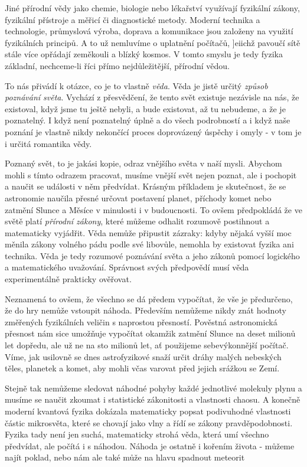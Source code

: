       Jiné přírodní vědy jako chemie, biologie nebo lékařství využívají fyzikální zákony, fyzikální
      přístroje a měřicí či diagnostické metody. Moderní technika a technologie, průmyslová výroba,
      doprava a komunikace jsou založeny na využití fyzikálních principů. A to už nemluvíme o
      uplatnění počítačů, ]eiichž pavoučí sítě stále více opřádají zeměkouli a blízký kosmos. V
      tomto smyslu je tedy fyzika základní, nechceme-li říci přímo nejdůležitější, přírodní vědou. 
      
      To nás přivádí k otázce, co je to vlastně \emph{věda}. Věda je jistě určitý \emph{způsob
      poznávání světa}. Vychází z přesvědčení, že tento svět existuje nezávisle na nás, že
      existoval, když jsme tu ještě nebyli, a bude existovat, až tu nebudeme, a že je poznatelný. I
      když není poznatelný úplně a do všech podrobností a i když naše poznání je vlastně nikdy
      nekončící proces doprovázený úspěchy i omyly - v tom je i určitá romantika vědy.  
      
      Poznaný svět, to je jakási kopie, odraz vnějšího světa v naší mysli. Abychom mohli s tímto
      odrazem pracovat, musíme vnější svět nejen poznat, ale i pochopit a naučit se události v něm
      předvídat. Krásným příkladem je skutečnost, že se astronomie naučila přesné určovat postavení
      planet, příchody komet nebo zatmění Slunce a Měsíce v minulosti i v budoucnosti. To ovšem
      předpokládá že ve světě platí \emph{přírodní zákony}, které můžeme odhalit rozumově postihnout
      a matematicky vyjádřit. Věda nemůže připustit zázraky: kdyby nějaká vyšší moc měnila zákony
      volného pádu podle své libovůle, nemohla by existovat fyzika ani technika. Věda je tedy
      rozumové poznávání světa a jeho zákonů pomocí logického a matematického uvažování. Správnost
      svých předpovědí musí věda experimentálně prakticky ověřovat.

      Neznamená to ovšem, že všechno se dá předem vypočítat, že vše je předurčeno, že do hry nemůže
      vstoupit náhoda. Především nemůžeme nikdy znát hodnoty změřených fyzikálních veličin s
      naprostou přesností. Pověstná astronomická přesnost nám sice umožňuje vypočítat okamžik
      zatmění Slunce na deset milionů let dopředu, ale už ne na sto milionů let, ať použijeme
      sebevýkonnější počítač. Víme, jak usilovně se dnes astrofyzikové snaží určit dráhy malých
      nebeských těles, planetek a komet, aby mohli včas varovat před jejich srážkou se Zemí.

      Stejně tak nemůžeme sledovat náhodné pohyby každé jednotlivé molekuly plynu a musíme se naučit
      zkoumat i statistické zákonitosti a vlastnosti chaosu. A konečně moderní kvantová fyzika
      dokázala matematicky popsat podivuhodné vlastnosti částic mikrosvěta, které se chovají jako
      vlny a řídí se zákony pravděpodobnosti. Fyzika tady není jen suchá, matematicky strohá věda,
      která umí všechno předvídat, ale počítá i s náhodou. Náhoda je ostatně i kořením života -
      můžeme najít poklad, nebo nám ale také může na hlavu spadnout meteorit

